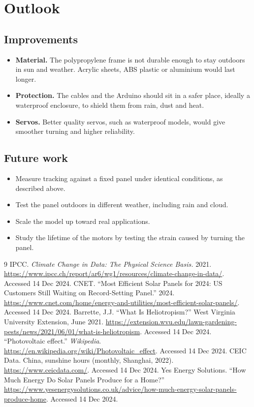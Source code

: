 \documentclass[11pt,a4paper]{article}
\begin{document}
\section{Outlook}

\subsection{Improvements}
\begin{itemize}[nosep]
  \item \textbf{Material.} The polypropylene frame is not durable enough to stay outdoors in sun and weather. Acrylic sheets, ABS plastic or aluminium would last longer.
  \item \textbf{Protection.} The cables and the Arduino should sit in a safer place, ideally a waterproof enclosure, to shield them from rain, dust and heat.
  \item \textbf{Servos.} Better quality servos, such as waterproof models, would give smoother turning and higher reliability.
\end{itemize}

\subsection{Future work}
\begin{itemize}[nosep]
  \item Measure tracking against a fixed panel under identical conditions, as described above.
  \item Test the panel outdoors in different weather, including rain and cloud.
  \item Scale the model up toward real applications.
  \item Study the lifetime of the motors by testing the strain caused by turning the panel.
\end{itemize}

\begin{thebibliography}{9}\small
   IPCC. \emph{Climate Change in Data: The Physical Science Basis.} 2021. \url{https://www.ipcc.ch/report/ar6/wg1/resources/climate-change-in-data/}. Accessed 14 Dec 2024.
   CNET. ``Most Efficient Solar Panels for 2024: US Customers Still Waiting on Record-Setting Panel.'' 2024. \url{https://www.cnet.com/home/energy-and-utilities/most-efficient-solar-panels/}. Accessed 14 Dec 2024.
   Barrette, J.J. ``What Is Heliotropism?'' West Virginia University Extension, June 2021. \url{https://extension.wvu.edu/lawn-gardening-pests/news/2021/06/01/what-is-heliotropism}. Accessed 14 Dec 2024.
   ``Photovoltaic effect.'' \emph{Wikipedia}. \url{https://en.wikipedia.org/wiki/Photovoltaic_effect}. Accessed 14 Dec 2024.
   CEIC Data. China, sunshine hours (monthly, Shanghai, 2022). \url{https://www.ceicdata.com/}. Accessed 14 Dec 2024.
   Yes Energy Solutions. ``How Much Energy Do Solar Panels Produce for a Home?'' \url{https://www.yesenergysolutions.co.uk/advice/how-much-energy-solar-panels-produce-home}. Accessed 14 Dec 2024.
\end{thebibliography}
\end{document}
